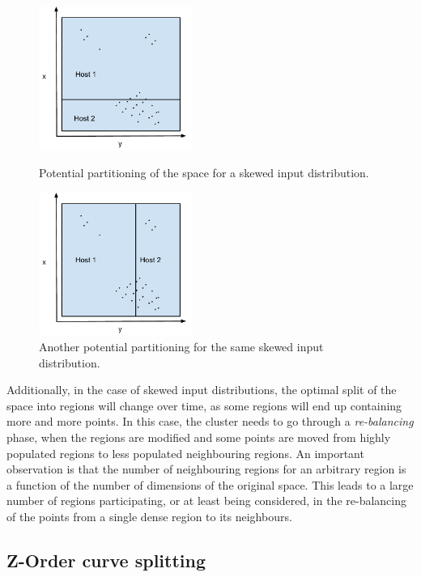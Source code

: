 \documentclass[11pt,a4paper]{globis-book}
\begin{document}
\begin{figure}[t]
\centering
\parbox{5cm}{
    \includegraphics[width=5cm]{images/geometric-bad-split}
    \caption{Potential partitioning of the space for a skewed input distribution.}
    \label{fig:geometric-bad-split}}
\qquad
\begin{minipage}{5cm}
    \includegraphics[width=5cm]{images/geometric-bad-split-2}
    \caption{Another potential partitioning for the same skewed input distribution.}
    \label{fig:geometric-bad-split-2}
\end{minipage}
\end{figure}
        
Additionally, in the case of skewed input distributions, the optimal split of the space into regions will change over time, as some regions will end up containing more and more points. In this case, the cluster needs to go through a \textit{re-balancing} phase, when the regions are modified and some points are moved from highly populated regions to less populated neighbouring regions. An important observation is that the number of neighbouring regions for an arbitrary region is a function of the number of dimensions of the original space. This leads to a large number of regions participating, or at least being considered, in the re-balancing of the points from a single dense region to its neighbours. 

\subsection{Z-Order curve splitting}
\end{document}
